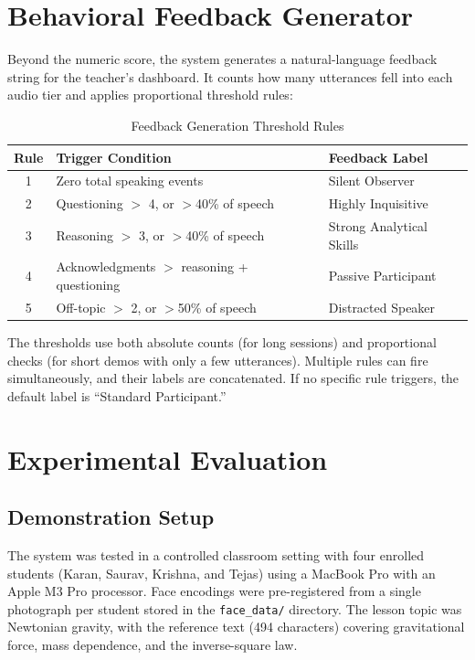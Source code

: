 \documentclass[conference]{IEEEtran}
\begin{document}
\section{Behavioral Feedback Generator}
Beyond the numeric score, the system generates a natural-language feedback string for the teacher's dashboard. It counts how many utterances fell into each audio tier and applies proportional threshold rules:
\begin{table}[htbp]
\caption{Feedback Generation Threshold Rules}
\begin{center}
\begin{tabular}{|c|p{3.6cm}|p{2.8cm}|}
\hline
\textbf{Rule} & \textbf{Trigger Condition} & \textbf{Feedback Label} \\
\hline
1 & Zero total speaking events & Silent Observer \\
\hline
2 & Questioning $>$ 4, or $>$40\% of speech & Highly Inquisitive \\
\hline
3 & Reasoning $>$ 3, or $>$40\% of speech & Strong Analytical Skills \\
\hline
4 & Acknowledgments $>$ reasoning + questioning & Passive Participant \\
\hline
5 & Off-topic $>$ 2, or $>$50\% of speech & Distracted Speaker \\
\hline
\end{tabular}
\label{tab:feedback}
\end{center}
\end{table}
The thresholds use both absolute counts (for long sessions) and proportional checks (for short demos with only a few utterances). Multiple rules can fire simultaneously, and their labels are concatenated. If no specific rule triggers, the default label is ``Standard Participant.''
\section{Experimental Evaluation}
\subsection{Demonstration Setup}
The system was tested in a controlled classroom setting with four enrolled students (Karan, Saurav, Krishna, and Tejas) using a MacBook Pro with an Apple M3 Pro processor. Face encodings were pre-registered from a single photograph per student stored in the \texttt{face\_data/} directory. The lesson topic was Newtonian gravity, with the reference text (494 characters) covering gravitational force, mass dependence, and the inverse-square law.
\end{document}
